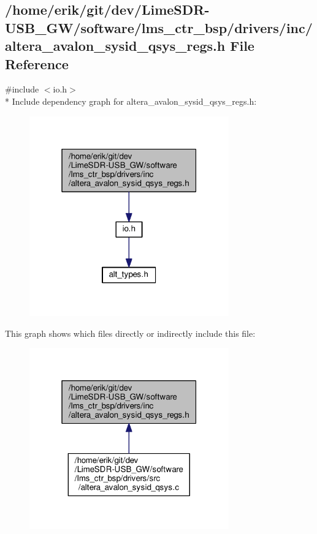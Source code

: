 \subsection{/home/erik/git/dev/\+Lime\+S\+D\+R-\/\+U\+S\+B\+\_\+\+G\+W/software/lms\+\_\+ctr\+\_\+bsp/drivers/inc/altera\+\_\+avalon\+\_\+sysid\+\_\+qsys\+\_\+regs.h File Reference}
\label{altera__avalon__sysid__qsys__regs_8h}
{\ttfamily \#include $<$io.\+h$>$}\\*
Include dependency graph for altera\+\_\+avalon\+\_\+sysid\+\_\+qsys\+\_\+regs.\+h\+:
\nopagebreak
\begin{figure}[H]
\begin{center}
\leavevmode
\includegraphics[width=244pt]{d8/da1/altera__avalon__sysid__qsys__regs_8h__incl}
\end{center}
\end{figure}
This graph shows which files directly or indirectly include this file\+:
\nopagebreak
\begin{figure}[H]
\begin{center}
\leavevmode
\includegraphics[width=244pt]{d0/df5/altera__avalon__sysid__qsys__regs_8h__dep__incl}
\end{center}
\end{figure}
